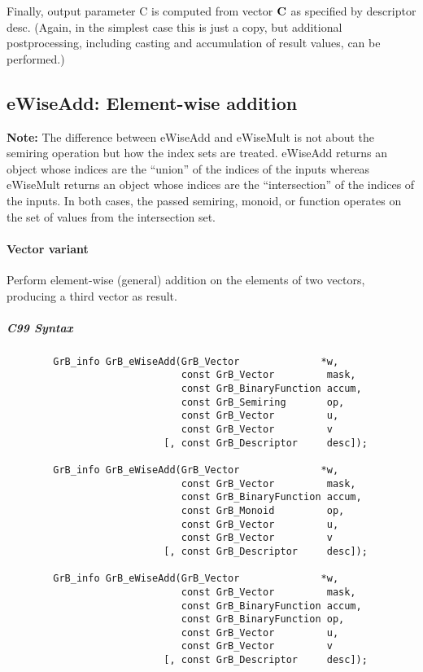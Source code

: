 Finally, output parameter {\sf C} is computed from vector ${\bf C}$
as specified by descriptor {\sf desc}. (Again, in the simplest case this
is just a copy, but additional postprocessing, including casting and
accumulation of result values, can be performed.) 



\subsection{{\sf eWiseAdd}: Element-wise addition}

{\bf Note:} The difference between {\sf eWiseAdd} and {\sf eWiseMult} is not about the semiring operation but how the index sets are treated.
 {\sf eWiseAdd} returns an object whose indices are the ``union'' of the indices of the inputs whereas  
 {\sf eWiseMult} returns an object whose indices are the ``intersection'' of the indices of the inputs. In both cases, the passed semiring, monoid, or function operates on the 
 set of values from the intersection set. 

\paragraph{Vector variant}

Perform element-wise (general) addition on the elements of two vectors,
producing a third vector as result.

\subparagraph{C99 Syntax}

\begin{verbatim}
        GrB_info GrB_eWiseAdd(GrB_Vector              *w,
                              const GrB_Vector         mask,
                              const GrB_BinaryFunction accum,
                              const GrB_Semiring       op, 
                              const GrB_Vector         u,
                              const GrB_Vector         v
                           [, const GrB_Descriptor     desc]);
                            
        GrB_info GrB_eWiseAdd(GrB_Vector              *w,
                              const GrB_Vector         mask,
                              const GrB_BinaryFunction accum,
                              const GrB_Monoid         op, 
                              const GrB_Vector         u,
                              const GrB_Vector         v
                           [, const GrB_Descriptor     desc]);
                            
        GrB_info GrB_eWiseAdd(GrB_Vector              *w,
                              const GrB_Vector         mask,
                              const GrB_BinaryFunction accum,
                              const GrB_BinaryFunction op, 
                              const GrB_Vector         u,
                              const GrB_Vector         v
                           [, const GrB_Descriptor     desc]);
\end{verbatim}

